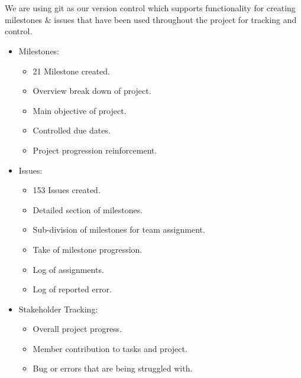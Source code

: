 \documentclass[letterpaper]{article}
\begin{document}
	\section*{\colorbox{black}{}} 
		\vspace{0.1in}
		
		We are using git as our version control which supports functionality for creating milestones \& issues that have been used throughout the project for tracking and control.
			
		\begin{itemize}
			\item Milestones:
				\begin{itemize}
					\item 21 Milestone created.
					\item Overview break down of project.
					\item Main objective of project.
					\item Controlled due dates.
					\item Project progression reinforcement.
				\end{itemize}
			\item Issues:
				\begin{itemize}
					\item 153 Issues created.
					\item Detailed section of milestones.
					\item Sub-division of milestones for team assignment.
					\item Take of milestone progression.
					\item Log of assignments.
					\item Log of reported error.
				\end{itemize}
			\item Stakeholder Tracking:
				\begin{itemize}
					\item Overall project progress.
					\item Member contribution to tasks and project.
					\item Bug or errors that are being struggled with.
				\end{itemize}
		\end{itemize}
		
		\vspace{0.2in}
	\section*{\colorbox{black}{}} 
		\vspace{0.1in}
		
\end{document}
